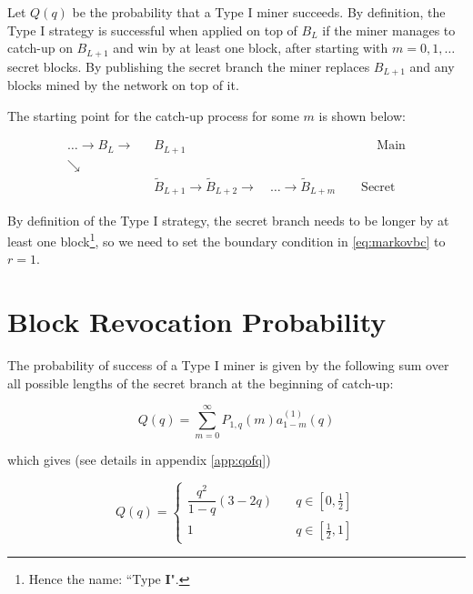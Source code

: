 \documentclass[letterpaper,12pt]{report}
\theoremstyle{plain}
\theoremstyle{definition}
\begin{document}
Let $\mathit{Q}(q)$ be the probability that a Type I miner succeeds. By definition, the Type I strategy is successful when applied on top of $\mathit{B}_L$ if the miner manages to catch-up on $B_{L+1}$ and win by at least one block, after starting with $m=0,1,\dots$ secret blocks. 
By publishing the secret branch the miner replaces $\mathit{B}_{L+1}$ and any blocks mined by the network on top of it. 



The starting point for the catch-up process for some $m$ is shown below:

\begin{eqnarray}\label{blockhidingboundary}
 \dots \rightarrow \mathit{B}_L\rightarrow &\mathit{B}_{L+1} \qquad\qquad\qquad\qquad\qquad\qquad\qquad\quad \mathrm{Main}\\\nonumber
\searrow & \\\nonumber
\qquad \qquad \qquad & \widetilde{\mathit{B}}_{L+1}\rightarrow\widetilde{\mathit{B}}_{L+2}
\longrightarrow \quad \dots \longrightarrow\widetilde{\mathit{B}}_{L+m}\qquad \mathrm{Secret}
\end{eqnarray}

By definition of the Type I strategy, the secret branch needs to be longer by at least one block\footnote{Hence the name: ``Type \textbf{I}".}, so we need to set the boundary condition in \ref{eq:markovbc} to $r=1$. 

\section{Block Revocation Probability}

The probability of success of a Type I miner is given by the following sum over all possible lengths of the secret branch at the beginning of catch-up:

\begin{equation}\label{eq:qofpdef}
\mathit{Q}(q)=\sum_{m=0}^{\infty}\mathit{P}_{1,q}(m)\mathit{a}^{(1)}_{1-m}(q)
\end{equation}

which gives (see details in appendix \ref{app:qofq})

\begin{equation}\label{eq:qofp}
\mathit{Q}(q)=
\begin{cases}
\dfrac{q^2}{1-q}\left(3-2q\right) & \quad q \in [0,\frac{1}{2}] \\
1 & \quad q \in [\frac{1}{2},1] 
\end{cases}
\end{equation}
\end{document}

